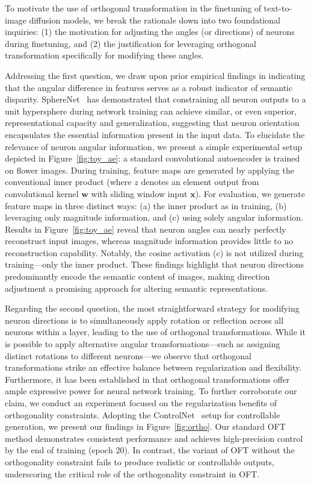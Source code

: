 To motivate the use of orthogonal transformation in the finetuning of text-to-image diffusion models, we break the rationale down into two foundational inquiries: (1) the motivation for adjusting the angles (or directions) of neurons during finetuning, and (2) the justification for leveraging orthogonal transformation specifically for modifying these angles.

Addressing the first question, we draw upon prior empirical findings in \cite{liu2018decoupled,chen2020angular} indicating that the angular difference in features serves as a robust indicator of semantic disparity. SphereNet~\cite{liu2017deep} has demonstrated that constraining all neuron outputs to a unit hypersphere during network training can achieve similar, or even superior, representational capacity and generalization, suggesting that neuron orientation encapsulates the essential information present in the input data. To elucidate the relevance of neuron angular information, we present a simple experimental setup depicted in Figure~\ref{fig:toy_ae}: a standard convolutional autoencoder is trained on flower images. During training, feature maps are generated by applying the conventional inner product (where $z$ denotes an element output from convolutional kernel $\bm{w}$ with sliding window input $\bm{x}$). For evaluation, we generate feature maps in three distinct ways: (a) the inner product as in training, (b) leveraging only magnitude information, and (c) using solely angular information. Results in Figure~\ref{fig:toy_ae} reveal that neuron angles can nearly perfectly reconstruct input images, whereas magnitude information provides little to no reconstruction capability. Notably, the cosine activation (c) is not utilized during training—only the inner product. These findings highlight that neuron directions predominantly encode the semantic content of images, making direction adjustment a promising approach for altering semantic representations.

Regarding the second question, the most straightforward strategy for modifying neuron directions is to simultaneously apply rotation or reflection across all neurons within a layer, leading to the use of orthogonal transformations. While it is possible to apply alternative angular transformations—such as assigning distinct rotations to different neurons—we observe that orthogonal transformations strike an effective balance between regularization and flexibility. Furthermore, it has been established in \cite{liu2021orthogonal} that orthogonal transformations offer ample expressive power for neural network training. To further corroborate our claim, we conduct an experiment focused on the regularization benefits of orthogonality constraints. Adopting the ControlNet~\cite{zhang2023adding} setup for controllable generation, we present our findings in Figure~\ref{fig:ortho}. Our standard OFT method demonstrates consistent performance and achieves high-precision control by the end of training (epoch 20). In contrast, the variant of OFT without the orthogonality constraint fails to produce realistic or controllable outputs, underscoring the critical role of the orthogonality constraint in OFT.

